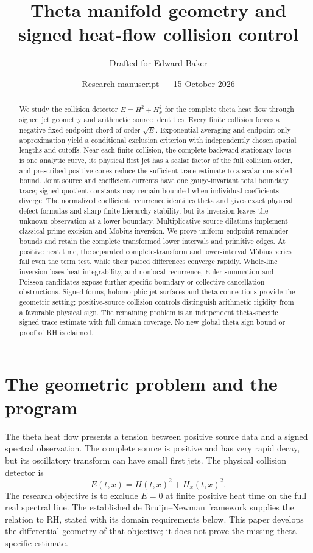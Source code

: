 \documentclass[11pt]{article}
\title{Theta manifold geometry and\\signed heat-flow collision control}
\author{Drafted for Edward Baker}
\date{Research manuscript --- 15 October 2026}
\numberwithin{equation}{section}
\theoremstyle{definition}
\theoremstyle{remark}
\begin{document}
\maketitle
\begin{abstract}
We study the collision detector $E=H^2+H_x^2$ for the complete theta
heat flow through signed jet geometry and arithmetic source identities.
Every finite collision forces a negative fixed-endpoint chord of order
$\sqrt E$. Exponential averaging and endpoint-only approximation yield
a conditional exclusion criterion with independently chosen spatial
lengths and cutoffs. Near each finite collision, the complete backward
stationary locus is one analytic curve, its physical first jet has a scalar factor of the full
collision order, and prescribed positive cones reduce the sufficient
trace estimate to a scalar one-sided bound. Joint source and coefficient
currents have one gauge-invariant total boundary trace; signed quotient
constants may remain bounded when individual coefficients diverge.
The normalized coefficient recurrence identifies theta and gives exact
physical defect formulas and sharp finite-hierarchy stability, but its
inversion leaves the unknown observation at a lower boundary.
Multiplicative source dilations implement classical prime excision and
M\"obius inversion. We prove uniform endpoint remainder bounds and retain
the complete transformed lower intervals and primitive edges.
At positive heat time, the separated complete-transform and lower-interval
M\"obius series fail even the term test, while their paired differences
converge rapidly. Whole-line inversion loses heat integrability, and
nonlocal recurrence, Euler-summation and Poisson candidates expose
further specific boundary or collective-cancellation obstructions.
Signed forms, holomorphic jet surfaces and theta connections provide
the geometric setting; positive-source collision controls distinguish
arithmetic rigidity from a favorable physical sign. The remaining
problem is an independent theta-specific signed trace estimate with
full domain coverage. No new global theta sign bound or proof of RH
is claimed.
\end{abstract}
\setcounter{tocdepth}{2}
\begingroup
\small
\tableofcontents
\endgroup
\clearpage

\section{The geometric problem and the program}\label{intro:section}

The theta heat flow presents a tension between positive source data and
a signed spectral observation.  The complete source is positive and has
very rapid decay, but its oscillatory transform can have small first
jets.  The physical collision detector is
\[
 E(t,x)=H(t,x)^2+H_x(t,x)^2.
\]
The research objective is to exclude $E=0$ at finite positive heat time
on the full real spectral line.  The established de Bruijn--Newman
framework supplies the relation to RH, stated with its domain
requirements below.  This paper develops the differential geometry of
that objective; it does not prove the missing theta-specific estimate.
\end{document}
